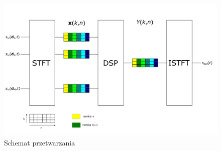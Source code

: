 \begin{figure}[h!]
    \centering
    \includegraphics[width=\textwidth]{Images/processing.png}
    \caption{Schemat przetwarzania}
    \label{fig:processing}
\end{figure}

